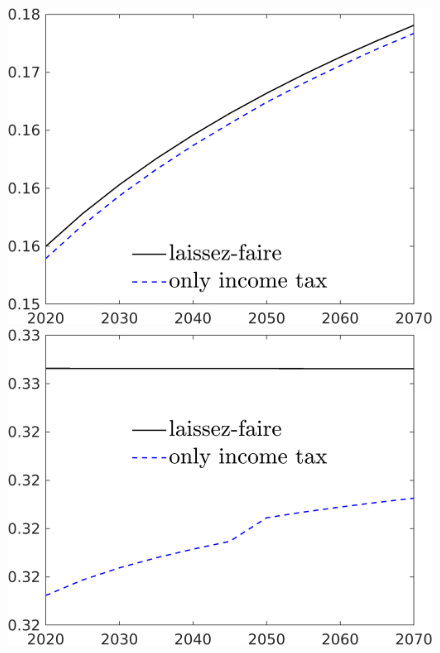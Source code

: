 \begin{figure}[h!!]
\begin{minipage}[]{0.32\textwidth}
	\end{minipage}
\begin{minipage}[]{0.32\textwidth}
	\includegraphics[width=1\textwidth]{../../codding_model/own_basedOnFried/optimalPol_190722_tidiedUp/figures/all_10Aout22/CountTaul_modtest_target_LgLf_spillover0_sep1_extern0_PV1_etaa0.79_lgd1.png}
\end{minipage}
\begin{minipage}[]{0.32\textwidth}
	\includegraphics[width=1\textwidth]{../../codding_model/own_basedOnFried/optimalPol_190722_tidiedUp/figures/all_10Aout22/CountTaul_modtest_target_hl_spillover0_sep1_extern0_PV1_etaa0.79_lgd1.png}

\end{minipage}
\end{figure}
